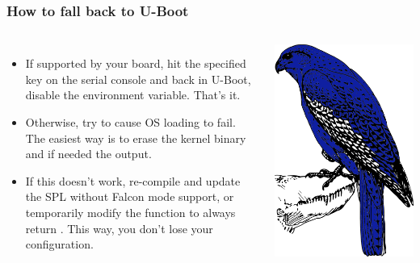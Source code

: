 \begin{frame}[fragile]
\frametitle{How to fall back to U-Boot}
   \begin{columns}
   \begin{itemize}
     \item If supported by your board, hit the specified key on the
           serial console and back in U-Boot, disable the 
	   environment variable. That's it.
     \item Otherwise, try to cause OS loading to fail. The easiest way
	   is to erase the kernel binary and if needed the  output.
     \item If this doesn't work, re-compile and update the SPL without
	   Falcon mode support, or temporarily modify the
            function
	   to always return . This way, you don't lose your
	   configuration.
   \end{itemize}
      \begin{center}
      \includegraphics[height=0.6\textheight]{slides/boot-time-u-boot-falcon-mode/falcon-blue.png}
      \end{center}
   \end{columns}
\end{frame}

